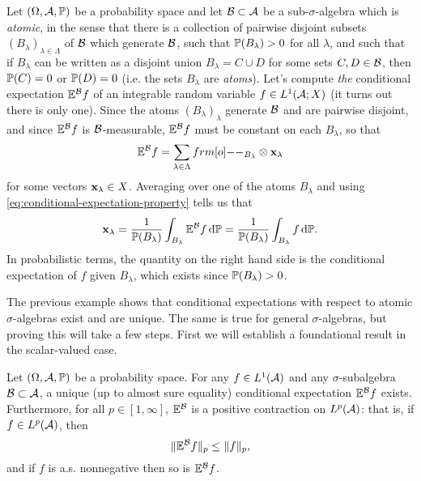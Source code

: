 \begin{example}
  Let $(\Omega,\mc{A},\P)$ be a probability space and let $\mc{B} \subset \mc{A}$ be a sub-$\sigma$-algebra which is \emph{atomic}, in the sense that there is a collection of pairwise disjoint subsets $(B_\lambda)_{\lambda \in \Lambda}$ of $\mc{B}$ which generate $\mc{B}$, such that $\P(B_{\lambda}) > 0$ for all $\lambda$, and such that if $B_\lambda$ can be written as a disjoint union $B_\lambda = C \cup D$ for some sets $C,D \in \mc{B}$, then $\P(C) = 0$ or $\P(D) = 0$ (i.e. the sets $B_\lambda$ are \emph{atoms}).
  Let's compute \emph{the} conditional expectation $\E^{\mc{B}}f$ of an integrable random variable $f \in L^1(\mc{A};X)$ (it turns out there is only one).
  Since the atoms $(B_\lambda)_{\lambda}$ generate $\mc{B}$ and are pairwise disjoint, and since $\E^{\mc{B}}f$ is $\mc{B}$-measurable, $\E^{\mc{B}}f$ must be constant on each $B_\lambda$, so that
  \begin{equation*}
    \E^{\mc{B}} f = \sum_{\lambda \in \Lambda} \1_{B_\lambda} \otimes \mb{x}_\lambda
  \end{equation*}
  for some vectors $\mb{x}_{\lambda} \in X$.
  Averaging over one of the atoms $B_{\lambda}$ and using \eqref{eq:conditional-expectation-property} tells us that
  \begin{equation*}
    \begin{aligned}
      \mb{x}_\lambda = \frac{1}{\P(B_\lambda)} \int_{B_\lambda} \E^{\mc{B}} f \, \dd\P = \frac{1}{\P(B_\lambda)} \int_{B_\lambda} f \, \dd\P.
    \end{aligned}
  \end{equation*}
  In probabilistic terms, the quantity on the right hand side is the conditional expectation of $f$ given $B_\lambda$, which exists since $\P(B_\lambda) > 0$.
\end{example}

The previous example shows that conditional expectations with respect to atomic $\sigma$-algebras exist and are unique.
The same is true for general $\sigma$-algebras, but proving this will take a few steps.
First we will establish a foundational result in the scalar-valued case.

\begin{thm}\label{thm:conditional-expectation-EU}
  Let $(\Omega,\mc{A},\P)$ be a probability space.
  For any $f \in L^1(\mc{A})$ and any $\sigma$-subalgebra $\mc{B} \subset \mc{A}$, a unique (up to almost sure equality) conditional expectation $\E^{\mc{B}}f$ exists.
  Furthermore, for all $p \in [1,\infty]$, $\E^{\mc{B}}$ is a positive contraction on $L^p(\mc{A})$: that is, if $f \in L^p(\mc{A})$, then
  \begin{equation*}
    \|\E^{\mc{B}}f\|_{p} \leq \|f\|_{p},
  \end{equation*}
  and if $f$ is a.s. nonnegative then so is $\E^{\mc{B}}f$.
\end{thm}

